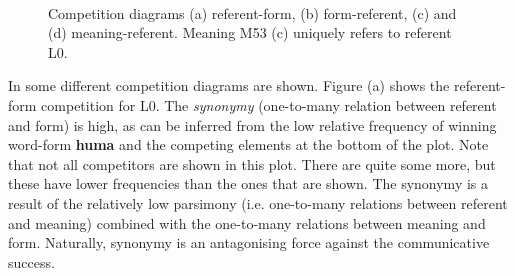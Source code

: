 \begin{figure}[t]
\centering
{}
\\
\caption{Competition diagrams (a) referent-form, (b) form-referent, (c) and (d) meaning-referent. Meaning M53 (c) uniquely refers to referent L0.}
\label{f:st:comp}
\end{figure}

In  some different competition diagrams are shown. Figure (a) shows the referent-form competition for L0. The {\em synonymy} (one-to-many relation between referent and form) is high, as can be inferred from the low relative frequency of winning word-form {\bf huma} and the competing elements at the bottom of the plot. Note that not all competitors are shown in this plot. There are quite some more, but these have lower frequencies than the ones that are shown. The synonymy is a result of the relatively low parsimony (i.e. one-to-many relations between referent and meaning) combined with the one-to-many relations between meaning and form. Naturally, synonymy is an antagonising force against the communicative success.

